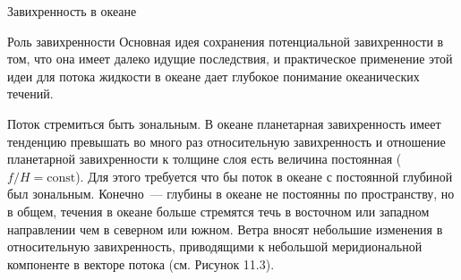 \begin{chapter}{Завихренность в океане}
\begin{section}{Роль завихренности}
Основная идея сохранения потенциальной завихренности в том, что она
имеет далеко идущие последствия, и практическое применение этой идеи
для потока жидкости в океане дает глубокое понимание океанических
течений.
%

\begin{paragraph}{Поток стремиться быть зональным.} 
В океане планетарная завихренность имеет тенденцию превышать во много
раз относительную завихренность и отношение планетарной завихренности
к толщине слоя есть величина постоянная ($f/H=\text{const}$). Для этого
требуется что бы поток в океане с постоянной глубиной был
зональным. Конечно~--- глубины в океане не постоянны по пространству,
но в общем, течения в океане больше стремятся течь в восточном или
западном направлении чем в северном или южном. Ветра вносят небольшие
изменения в относительную завихренность, приводящими к небольшой
меридиональной компоненте в векторе потока (см. Рисунок 11.3).
%
\end{paragraph}


\end{section}
\end{chapter}
